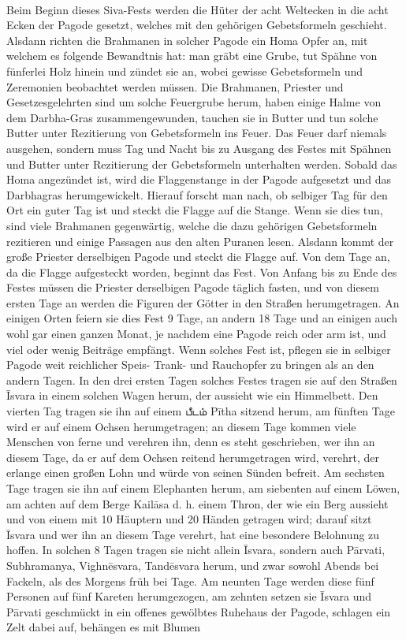 \documentclass{article}
\newcommand{\TamilText}[1]{\texttamil{#1}}
\newcommand{\tam}[1]{\TamilText{#1}}
\begin{document}
\paragraph{}
Beim Beginn dieses Siva-Fests werden die Hüter der acht Weltecken in die acht Ecken der Pagode gesetzt, welches mit den gehörigen Gebetsformeln geschieht. Alsdann richten die Brahmanen in solcher Pagode ein Homa Opfer an, mit welchem es folgende Bewandtnis hat: man gräbt eine Grube, tut Spähne von fünferlei Holz hinein und zündet sie an, wobei gewisse Gebetsformeln und Zeremonien beobachtet werden müssen. Die Brahmanen, Priester und Gesetzesgelehrten sind um solche Feuergrube herum, haben einige Halme von dem Darbha-Gras zusammengewunden, tauchen sie in Butter und tun solche Butter unter Rezitierung von Gebetsformeln ins Feuer. Das Feuer darf niemals ausgehen, sondern muss Tag und Nacht bis zu Ausgang des Festes mit Spähnen und Butter unter Rezitierung der Gebetsformeln unterhalten werden. Sobald das Homa angezündet ist, wird die Flaggenstange in der Pagode aufgesetzt und das Darbhagras herumgewickelt. Hierauf forscht man nach, ob selbiger Tag für den Ort ein guter Tag ist und steckt die Flagge auf die Stange. Wenn sie dies tun, sind viele Brahmanen gegenwärtig, welche die dazu gehörigen Gebetsformeln rezitieren und einige Passagen aus den alten Puranen lesen. Alsdann kommt der große Priester derselbigen Pagode und steckt die Flagge auf. Von dem Tage an, da die Flagge aufgesteckt worden, beginnt das Fest. Von Anfang bis zu Ende des Festes müssen die Priester derselbigen Pagode täglich fasten, und von diesem ersten Tage an werden die Figuren der Götter in den Straßen herumgetragen. An einigen Orten feiern sie dies Fest 9 Tage, an andern 18 Tage und an einigen auch wohl gar einen ganzen Monat, je nachdem eine Pagode reich oder arm ist, und viel oder wenig Beiträge empfängt. Wenn solches Fest ist, pflegen sie in selbiger Pagode weit reichlicher Speis- Trank- und Rauchopfer zu bringen als an den andern Tagen. In den drei ersten Tagen solches Festes tragen sie auf den Straßen \={I}svara in einem solchen Wagen herum, der aussieht wie ein Himmelbett. Den vierten Tag tragen sie ihn auf einem \tam{பீடம்} P\={i}tha sitzend herum, am fünften Tage wird er auf einem Ochsen herumgetragen; an diesem Tage kommen viele Menschen von ferne und verehren ihn, denn es steht geschrieben, wer ihn an diesem Tage, da er auf dem Ochsen reitend herumgetragen wird, verehrt, der erlange einen großen Lohn und würde von seinen Sünden befreit. Am sechsten Tage tragen sie ihn auf einem Elephanten herum, am siebenten auf einem Löwen, am achten auf dem Berge Kail\={a}sa d. h. einem Thron, der wie ein Berg aussieht und von einem mit 10 Häuptern und 20 Händen getragen wird; darauf sitzt \={I}svara und wer ihn an diesem Tage verehrt, hat eine besondere Belohnung zu hoffen. In solchen 8 Tagen tragen sie nicht allein \={I}svara, sondern auch P\={a}rvati, Subhramanya, Vighn\={e}svara, Tand\={e}svara herum, und zwar sowohl Abends bei Fackeln, als des Morgens früh bei Tage. Am neunten Tage werden diese fünf Personen auf fünf Kareten herumgezogen, am zehnten setzen sie \={I}svara und P\={a}rvati geschmückt in ein offenes gewölbtes Ruhehaus der Pagode, schlagen ein Zelt dabei auf, behängen es mit Blumen 
\end{document}
